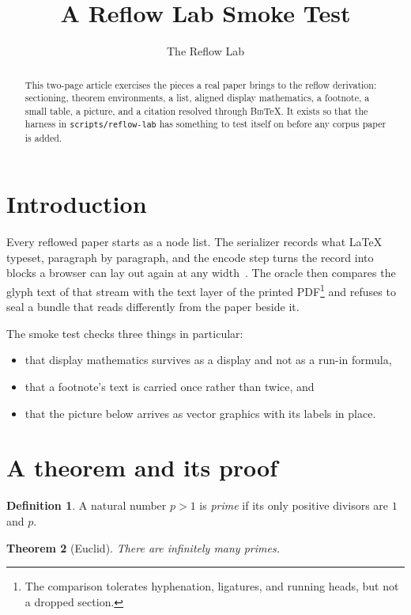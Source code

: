 \documentclass[11pt]{article}
\title{A Reflow Lab Smoke Test}
\author{The Reflow Lab}
\date{}
\newtheorem{theorem}{Theorem}[section]
\theoremstyle{definition}
\newtheorem{definition}[theorem]{Definition}
\begin{document}
\maketitle

\begin{abstract}
  This two-page article exercises the pieces a real paper brings to the
  reflow derivation: sectioning, theorem environments, a list, aligned
  display mathematics, a footnote, a small table, a picture, and a
  citation resolved through \textsc{Bib}\TeX. It exists so that the
  harness in \texttt{scripts/reflow-lab} has something to test itself on
  before any corpus paper is added.
\end{abstract}

\section{Introduction}

Every reflowed paper starts as a node list. The serializer records what
\LaTeX{} typeset, paragraph by paragraph, and the encode step turns the
record into blocks a browser can lay out again at any width~\cite{knuth84}.
The oracle then compares the glyph text of that stream with the text layer
of the printed PDF\footnote{The comparison tolerates hyphenation, ligatures,
and running heads, but not a dropped section.} and refuses to seal a bundle
that reads differently from the paper beside it.

The smoke test checks three things in particular:
\begin{itemize}
  \item that display mathematics survives as a display and not as a
    run-in formula,
  \item that a footnote's text is carried once rather than twice, and
  \item that the picture below arrives as vector graphics with its
    labels in place.
\end{itemize}

\section{A theorem and its proof}

\begin{definition}
  A natural number $p > 1$ is \emph{prime} if its only positive divisors
  are $1$ and $p$.
\end{definition}

\begin{theorem}[Euclid]\label{thm:euclid}
  There are infinitely many primes.
\end{theorem}
\end{document}
